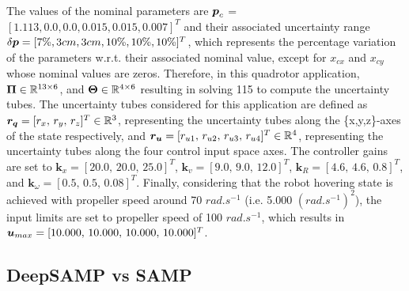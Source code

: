 The values of the nominal parameters are $\boldsymbol{p}_{c}$ = $[1.113, 0.0, 0.0, 0.015, 0.015, 0.007]^T$ and their associated uncertainty range $\delta\boldsymbol{p} = [7\%, 3cm, 3cm, 10\%, 10\%, 10\%]^T$, which represents the percentage variation of the parameters w.r.t. their associated nominal value, except for $x_{cx}$ and $x_{cy}$ whose nominal values are zeros.
Therefore, in this quadrotor application, $\boldsymbol{\Pi} \in \mathbb{R}^{13\times6}$, and $\boldsymbol{\Theta} \in \mathbb{R}^{4\times6}$ resulting in solving 115  to compute the uncertainty tubes.
The uncertainty tubes considered for this application are defined as $\boldsymbol{r_q} = [r_x, \, r_y, \, r_z]^T \in \mathbb{R}^3$, representing the uncertainty tubes along the \{x,y,z\}-axes of the state respectively, and $\boldsymbol{r_u} = [r_{u1}, \, r_{u2}, \, r_{u3}, \, r_{u4}]^T \in \mathbb{R}^4$, representing the uncertainty tubes along the four control input space axes.
The controller gains are set to $\boldsymbol{k}_{x} = [20.0, \, 20.0, \, 25.0]^T$, $\boldsymbol{k}_{v}= [9.0, \, 9.0, \, 12.0]^T$, $\boldsymbol{k}_{R}=[4.6, \, 4.6, \, 0.8]^T$, and $\boldsymbol{k}_{\omega}=[0.5, \, 0.5, \, 0.08]^T$.
Finally, considering that the robot hovering state is achieved with propeller speed around 70 $rad.s^{-1}$ (i.e. 5.000 $(rad.s^{-1})^2$), the input limits are set to propeller speed of 100 $rad.s^{-1}$, which results in $\boldsymbol{u}_{max} = [10.000, \, 10.000, \, 10.000, \, 10.000]^T$.

\subsection{DeepSAMP vs SAMP} \label{sec:NNresult}

